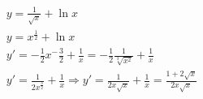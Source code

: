 \begin{ex}
\begin{align}
&y=\frac{1}{\sqrt{x}}+\ln{x}\nonumber\\
&y=x^\frac{1}{2}+\ln{x}\nonumber\\
&y'=-\frac{1}{2}x^-\frac{3}{2}+\frac{1}{x}=-\frac{1}{2}\frac{1}{\sqrt[3]{x^2}}+\frac{1}{x}\nonumber\\
&y'=\frac{1}{2x^\frac{3}{2}}+\frac{1}{x}\Rightarrow y'=\frac{1}{2x\sqrt{x}}+\frac{1}{x}=\frac{1+2\sqrt{x}}{2x\sqrt{x}}\nonumber
\end{align}
\end{ex}